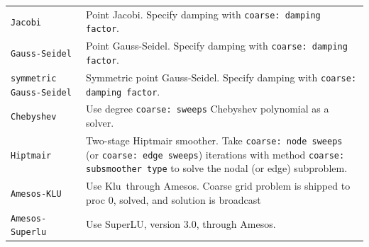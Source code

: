 \documentclass{article}[11pt]
\newcommand{\ML}     {{\bf ML}}
\newcommand{\amesos}  {{\sc Amesos}}
\newcommand{\superlu}  {{\sc SuperLU}}
\newcommand{\klu}  {{\sc Klu}}
\newcommand{\ifpack}  {{\sc Ifpack}}
\begin{document}
\begin{table}[tbh]
\begin{center}
\begin{tabular}{ | p{4.5cm} | p{10cm} | }
\hline
\verb!Jacobi! & Point Jacobi. Specify damping with
{\tt coarse: damping factor}.\\
%
\verb!Gauss-Seidel! & Point Gauss-Seidel. Specify
damping with {\tt coarse: damping factor}.\\
%
\verb!symmetric Gauss-Seidel! & Symmetric point Gauss-Seidel.
Specify damping with {\tt coarse: damping factor}.\\
\verb!Chebyshev! & Use degree {\tt coarse: sweeps} Chebyshev polynomial
             as a solver. \\
\verb!Hiptmair! & Two-stage Hiptmair smoother. Take {\tt coarse: node sweeps} 
             (or {\tt coarse: edge sweeps}) iterations with method
             {\tt coarse: subsmoother type} to solve the nodal (or edge) subproblem.\\
\verb!Amesos-KLU! & Use \klu\ through \amesos. Coarse grid problem is shipped to
 proc 0, solved, and solution is broadcast \\
\verb!Amesos-Superlu! & Use \superlu, version $3.0$, through \amesos. \\

\end{tabular}
\end{center}
\end{table}
\end{document}

